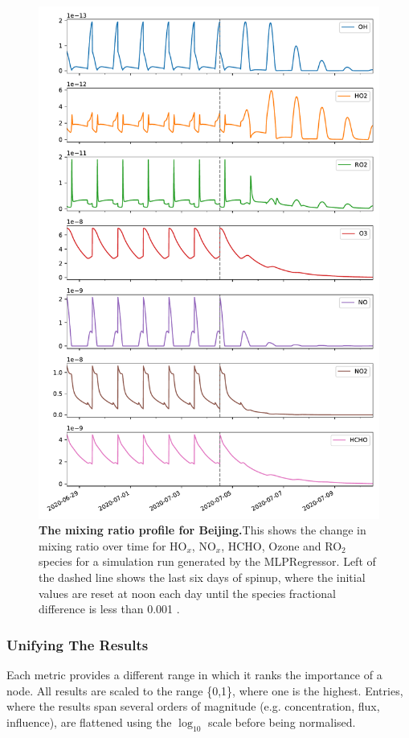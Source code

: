 \newpage


\begin{figure}[H]
    \centering
\includegraphics[width=.9\textwidth]{figures_c3/mlpregressor/conc_beijing.pdf}
\caption{\textbf{The mixing ratio profile for Beijing.}This shows the change in mixing ratio over time for HO$_x$, NO$_x$, HCHO, Ozone and RO$_2$ species for a simulation run generated by the MLPRegressor. Left of the dashed line shows the last six days of spinup, where the initial values are reset at noon each day until the species fractional difference is less than 0.001 .}\label{fig:cbeijing}
\end{figure}

\newpage





\subsubsection{Unifying The Results}
Each metric provides a different range in which it ranks the importance of a node. All results are scaled to the range \{0,1\}, where one is the highest. Entries, where the results span several orders of magnitude (e.g. concentration, flux, influence), are flattened using the $\log_{10}$ scale before being normalised.



